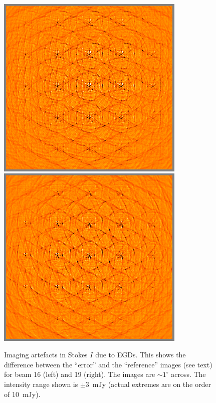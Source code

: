 \documentclass{aps2010} \special{papersize=8.5in,11in}
\begin{document}
\begin{figure}
\includegraphics[width=9cm]{diff15uncal}%
\includegraphics[width=9cm]{diff18uncal}%
\caption{\label{fig:diff-uncal}Imaging artefacts in Stokes $I$ due to EGDs. This shows the difference between the ``error'' and the ``reference'' images (see text) for beam 16 (left) and 19 (right). The images are $\sim1^\circ$ across. The intensity range shown is $\pm3$~mJy (actual extremes are on the order of 10~mJy).}
\end{figure}
\end{document}
